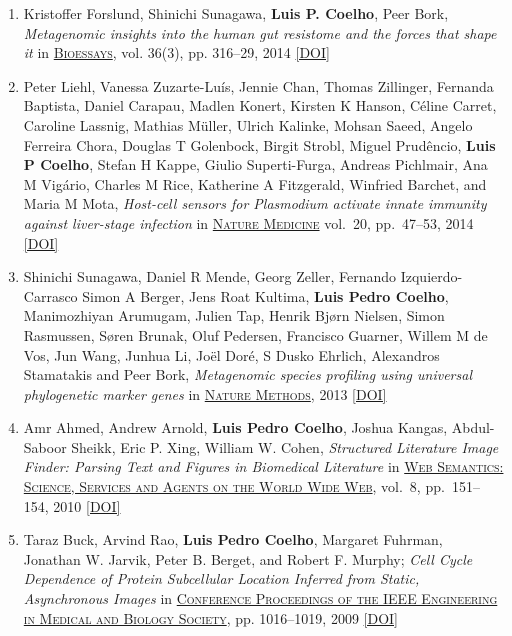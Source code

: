 \documentclass{article}
\newcommand\showdoi[1]{%
    \href{http://dx.doi.org/#1}{[DOI]}%
}
\newcommand\pubname[1]{\textsc{\uline{#1}}}
\newcommand\contribution[1]{\relax}
\begin{document}
\begin{enumerate}[resume]
\item Kristoffer Forslund, Shinichi Sunagawa, \textbf{Luis P. Coelho}, Peer
Bork, \emph{Metagenomic insights into the human gut resistome and the forces that
shape it} in \pubname{Bioessays}, vol. 36(3), pp. 316--29, 2014
\showdoi{10.1002/bies.201300143}
\contribution{I performed data analysis.}

\item Peter Liehl, Vanessa Zuzarte-Luís, Jennie Chan, Thomas Zillinger,
Fernanda Baptista, Daniel Carapau, Madlen Konert, Kirsten K Hanson, Céline
Carret, Caroline Lassnig, Mathias Müller, Ulrich Kalinke, Mohsan Saeed,
Angelo Ferreira Chora, Douglas T Golenbock, Birgit Strobl, Miguel Prudêncio,
\textbf{Luis P Coelho}, Stefan H Kappe, Giulio Superti-Furga, Andreas
Pichlmair, Ana M Vigário, Charles M Rice, Katherine A Fitzgerald, Winfried
Barchet, and Maria M Mota, \emph{Host-cell sensors for Plasmodium activate
innate immunity against liver-stage infection} in \pubname{Nature Medicine}
vol.\ 20, pp.\ 47--53, 2014 \showdoi{10.1038/nm.3424}
\contribution{I performed statistical analysis of the gene expression data.}

\item Shinichi Sunagawa, Daniel R Mende, Georg Zeller, Fernando
Izquierdo-Carrasco Simon A Berger, Jens Roat Kultima, \textbf{Luis Pedro
Coelho}, Manimozhiyan Arumugam, Julien Tap, Henrik Bjørn Nielsen, Simon
Rasmussen, Søren Brunak, Oluf Pedersen, Francisco Guarner, Willem M de Vos,
Jun Wang, Junhua Li, Joël Doré, S Dusko Ehrlich, Alexandros Stamatakis and
Peer Bork, \emph{Metagenomic species profiling using universal phylogenetic
marker genes} in \pubname{Nature Methods}, 2013 \showdoi{10.1038/nmeth.2693}
\contribution{I implemented the stand-alone version of the published metagenomics tool.}

\item Amr Ahmed, Andrew Arnold, \textbf{Luis Pedro Coelho}, Joshua Kangas,
Abdul-Saboor Sheikk, Eric P. Xing, William W. Cohen, \emph{Structured
Literature Image Finder: Parsing Text and Figures in Biomedical Literature} in
\pubname{Web Semantics: Science, Services and Agents on the World Wide Web},
vol.\ 8, pp.\ 151--154, 2010 \showdoi{10.1016/j.websem.2010.04.002}

\item Taraz Buck, Arvind Rao, \textbf{Luis Pedro Coelho}, Margaret Fuhrman,
Jonathan W. Jarvik, Peter B. Berget, and Robert F. Murphy; \emph{Cell Cycle
Dependence of Protein Subcellular Location Inferred from Static, Asynchronous
Images} in \pubname{Conference Proceedings of the IEEE Engineering in Medical
and Biology Society}, pp. 1016--1019, 2009 \showdoi{10.1109/IEMBS.2009.5332888}
\contribution{I helped the first author acquire relevant microscopy data.}


\end{enumerate}
\end{document}
